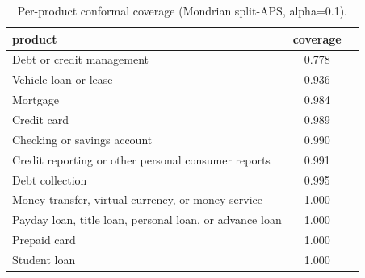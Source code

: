 \begin{table}[htbp]
\centering
\small
\begin{tabular}{lcc}
\toprule
product & coverage \\
\midrule
Debt or credit management & 0.778 \\
Vehicle loan or lease & 0.936 \\
Mortgage & 0.984 \\
Credit card & 0.989 \\
Checking or savings account & 0.990 \\
Credit reporting or other personal consumer reports & 0.991 \\
Debt collection & 0.995 \\
Money transfer, virtual currency, or money service & 1.000 \\
Payday loan, title loan, personal loan, or advance loan & 1.000 \\
Prepaid card & 1.000 \\
Student loan & 1.000 \\
\bottomrule
\end{tabular}
\caption{Per-product conformal coverage (Mondrian split-APS, alpha=0.1).}
\label{tab:pgcov}
\end{table}
